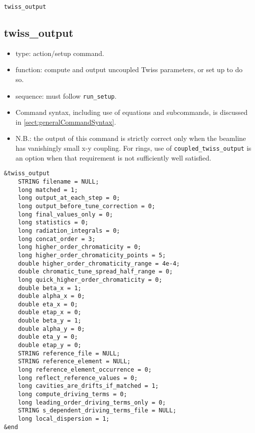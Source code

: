 \documentclass[11pt]{article}
\begin{document}
\newpage
\begin{center}{\Large\verb|twiss_output|}\end{center}
\subsection{twiss\_output \label{subsec:twissoutput}}

\begin{itemize}
\item type: action/setup command.
\item function: compute and output uncoupled Twiss parameters, or set up to do so.
\item sequence: must follow \verb|run_setup|.
\item Command syntax, including use of equations and subcommands, is discussed in \ref{sect:generalCommandSyntax}.
\item N.B.: the output of this command is strictly correct only when the beamline has vanishingly small x-y coupling.
  For rings, use of \verb|coupled_twiss_output| is an option when that requirement is not sufficiently well satisfied.
\end{itemize}

\begin{verbatim}
&twiss_output
    STRING filename = NULL;
    long matched = 1;
    long output_at_each_step = 0;
    long output_before_tune_correction = 0;
    long final_values_only = 0;
    long statistics = 0;
    long radiation_integrals = 0;
    long concat_order = 3;
    long higher_order_chromaticity = 0;
    long higher_order_chromaticity_points = 5;
    double higher_order_chromaticity_range = 4e-4;
    double chromatic_tune_spread_half_range = 0;
    long quick_higher_order_chromaticity = 0;
    double beta_x = 1;
    double alpha_x = 0;
    double eta_x = 0;
    double etap_x = 0;
    double beta_y = 1;
    double alpha_y = 0;
    double eta_y = 0;
    double etap_y = 0;
    STRING reference_file = NULL;
    STRING reference_element = NULL;
    long reference_element_occurrence = 0;
    long reflect_reference_values = 0;
    long cavities_are_drifts_if_matched = 1;
    long compute_driving_terms = 0;
    long leading_order_driving_terms_only = 0;
    STRING s_dependent_driving_terms_file = NULL;
    long local_dispersion = 1;
&end
\end{verbatim}
\end{document}
